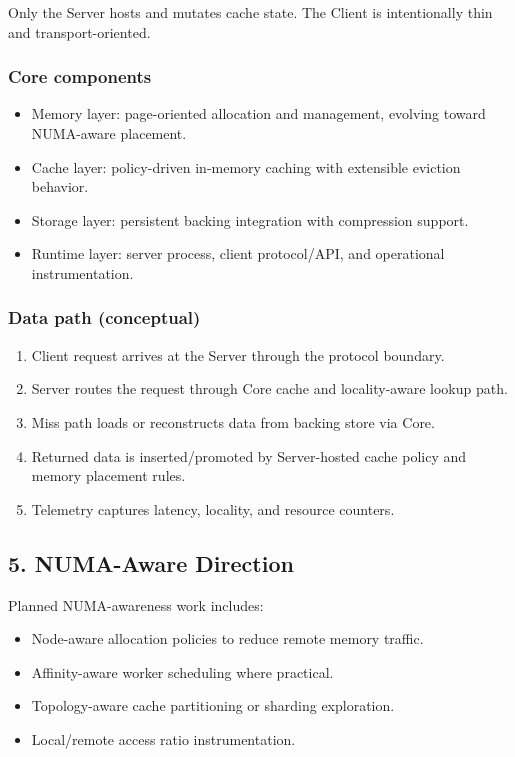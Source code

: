 \documentclass[
  english,
  letterpaper,
  DIV=11,
  numbers=noendperiod]{scrartcl}
\providecommand{\tightlist}{%
  \setlength{\itemsep}{0pt}\setlength{\parskip}{0pt}}
\begin{document}
Only the Server hosts and mutates cache state. The Client is
intentionally thin and transport-oriented.

\subsubsection{Core components}\label{core-components}

\begin{itemize}
\tightlist
\item
  Memory layer: page-oriented allocation and management, evolving toward
  NUMA-aware placement.
\item
  Cache layer: policy-driven in-memory caching with extensible eviction
  behavior.
\item
  Storage layer: persistent backing integration with compression
  support.
\item
  Runtime layer: server process, client protocol/API, and operational
  instrumentation.
\end{itemize}

\subsubsection{Data path (conceptual)}\label{data-path-conceptual}

\begin{enumerate}
\def\labelenumi{\arabic{enumi}.}
\tightlist
\item
  Client request arrives at the Server through the protocol boundary.
\item
  Server routes the request through Core cache and locality-aware lookup
  path.
\item
  Miss path loads or reconstructs data from backing store via Core.
\item
  Returned data is inserted/promoted by Server-hosted cache policy and
  memory placement rules.
\item
  Telemetry captures latency, locality, and resource counters.
\end{enumerate}

\subsection{5. NUMA-Aware Direction}\label{numa-aware-direction}

Planned NUMA-awareness work includes:

\begin{itemize}
\tightlist
\item
  Node-aware allocation policies to reduce remote memory traffic.
\item
  Affinity-aware worker scheduling where practical.
\item
  Topology-aware cache partitioning or sharding exploration.
\item
  Local/remote access ratio instrumentation.
\end{itemize}
\end{document}
